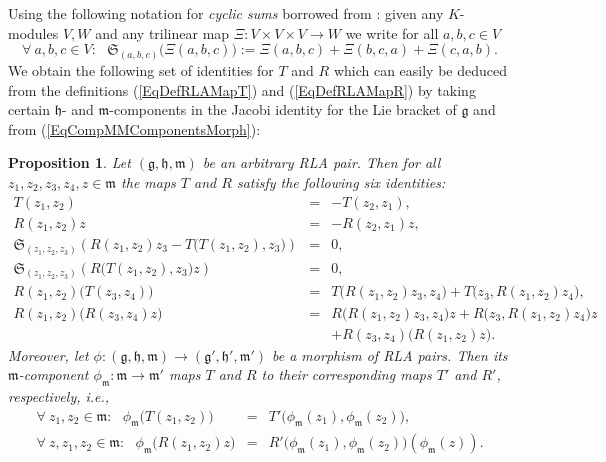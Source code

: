 \documentclass [11pt] {article}
\newtheorem {proposition} [lemma] {Proposition}
\theoremstyle{definition}
\begin{document}
\noindent Using the following notation for \textit{cyclic sums} borrowed from \cite[p.~135]{KN63}: given any $K$-modules
$V,W$ and any trilinear map $\Xi:V\times V\times V\to W$ we write for all
$a,b,c\in V$
\begin{equation}
	\forall~a,b,c\in V:~~~\mathfrak{S}_{(a,b,c)}\big(\Xi(a,b,c)\big):=
	\Xi(a,b,c)+\Xi(b,c,a)+\Xi(c,a,b).
\end{equation}
We obtain the 
following set of identities for $T$ and $R$ which can easily be deduced
from the definitions (\ref{EqDefRLAMapT}) and (\ref{EqDefRLAMapR}) by taking certain $\mathfrak{h}$- and $\mathfrak{m}$-components in the Jacobi identity for
the Lie bracket of $\mathfrak{g}$ and from  (\ref{EqCompMMComponentsMorph}):
\begin{proposition}\label{PLRAtoLieY}
	Let $(\mathfrak{g},\mathfrak{h},\mathfrak{m})$ be an arbitrary RLA pair. Then
	for all $z_1,z_2, z_3,z_4,z\in\mathfrak{m}$
	 the maps $T$ and $R$ satisfy the following six identities:
	\begin{eqnarray}
	T(z_1,z_2) & = & -T(z_2,z_1), \label{EqDefRLAToLieYAntisymT}\\
	R(z_1,z_2)z & = & -R(z_2,z_1)z, \label{EqDefRLAToLieYAntisymR}\\
	\mathfrak{S}_{(z_1,z_2,z_3)} 
	\left(R(z_1,z_2)z_3-T\big(T(z_1,z_2),z_3\big)\right)
	& = & 0, \label{EqDefRLAToLieYCyclicRandTTBianchi1}\\
	\mathfrak{S}_{(z_1,z_2,z_3)} 
	\left(R\big(T(z_1,z_2),z_3\big)z\right) & = &
	 0,\label{EqDefRLAToLieYCyclicRT}\\
	R(z_1,z_2)\big(T(z_3,z_4)\big)& = &
	  T\big(R(z_1,z_2)z_3,z_4\big)+T\big(z_3,R(z_1,z_2)z_4\big),
	   \label{EqDefRLAToLieYDeriROnT}\\
	R(z_1,z_2)\big(R(z_3,z_4)z\big) & = &
	R\big(R(z_1,z_2)z_3,z_4\big)z
	+R\big(z_3,R(z_1,z_2)z_4\big)z\nonumber \\
& &	+R(z_3,z_4)\big(R(z_1,z_2)z\big).
\label{EqDefRLAToLieYDeriROnR}
\end{eqnarray}
Moreover, let $\phi:(\mathfrak{g},\mathfrak{h},\mathfrak{m})\to
(\mathfrak{g}',\mathfrak{h}',\mathfrak{m}')$ be a morphism
of RLA pairs. Then its $\mathfrak{m}$-component
$\phi_\mathfrak{m}:\mathfrak{m}\to \mathfrak{m}'$ maps 
 $T$ and $R$ to their corresponding maps $T'$ and $R'$, respectively, i.e., 
\begin{eqnarray}
     \forall~z_1,z_2\in \mathfrak{m}:~~~\phi_\mathfrak{m}\big(T(z_1,z_2)\big)
     & = & T'\big(\phi_\mathfrak{m}(z_1),
        \phi_\mathfrak{m}(z_2)\big), \label{EqCompPhiSubMIntertwTTPrime}\\
     \forall~z, z_1,z_2\in \mathfrak{m}:~~~\phi_\mathfrak{m}\big(R(z_1,z_2)z\big)
     & = & R'\big(\phi_\mathfrak{m}(z_1),
     \phi_\mathfrak{m}(z_2)\big)(\phi_\mathfrak{m}(z)).
     \label{EqCompPhiSubMIntertwRRPrime}
\end{eqnarray}
\end{proposition}
\end{document}

